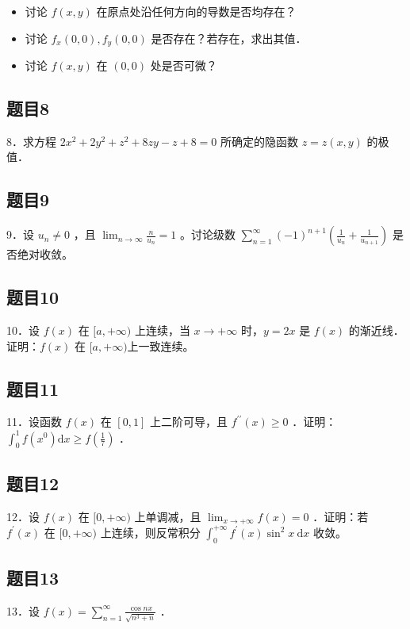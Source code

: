 \documentclass{article}
\begin{document}
\begin{itemize}
  \item[（1）] 讨论 \(f(x, y)\) 在原点处沿任何方向的导数是否均存在？
  \item[（2）] 讨论 \(f_{x}(0,0), f_{y}(0,0)\) 是否存在？若存在，求出其值．
  \item[（3）] 讨论 \(f(x, y)\) 在 \((0,0)\) 处是否可微？
\end{itemize}

\subsection{题目8}
8．求方程 \(2 x^{2}+2 y^{2}+z^{2}+8 z y-z+8=0\) 所确定的隐函数 \(z=z(x, y)\) 的极值．

\subsection{题目9}
9．设 \(u_{n} \neq 0\) ，且 \(\lim _{n \rightarrow \infty} \frac{n}{u_{n}}=1\) 。讨论级数 \(\sum_{n=1}^{\infty}(-1)^{n+1}\left(\frac{1}{u_{n}}+\frac{1}{u_{n+1}}\right)\) 是否绝对收敛。

\subsection{题目10}
10．设 \(f(x)\) 在 \([a,+\infty)\) 上连续，当 \(x \rightarrow+\infty\) 时，\(y=2 x\) 是 \(f(x)\) 的渐近线．证明：\(f(x)\) 在 \([a,+\infty)\)上一致连续。

\subsection{题目11}
11．设函数 \(f(x)\) 在 \([0,1]\) 上二阶可导，且 \(f^{\prime \prime}(x) \geq 0\) ．证明： \(\int_{0}^{1} f\left(x^{0}\right) \mathrm{d} x \geq f\left(\frac{1}{7}\right)\) ．

\subsection{题目12}
12．设 \(f(x)\) 在 \([0,+\infty)\) 上单调减，且 \(\lim _{x \rightarrow+\infty} f(x)=0\) ．证明：若 \(f^{\prime}(x)\) 在 \([0,+\infty)\) 上连续，则反常积分 \(\int_{0}^{+\infty} f^{\prime}(x) \sin ^{2} x \mathrm{~d} x\) 收敛。

\subsection{题目13}
13．设 \(f(x)=\sum_{n=1}^{\infty} \frac{\cos n x}{\sqrt{n^{3}+n}}\) ．
\end{document}
